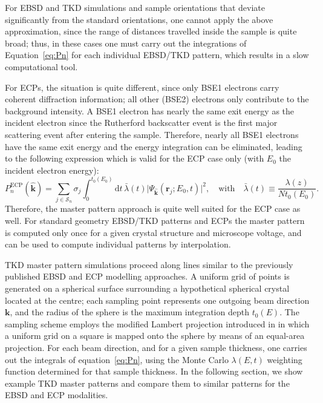 For EBSD and TKD simulations and sample orientations that deviate significantly from the standard orientations, one cannot apply the above approximation, since the range of distances travelled inside the sample is quite broad; thus, in these cases one must carry out the integrations of Equation~\ref{eq:Pn} for each individual EBSD/TKD pattern, which results in a slow computational tool.

For ECPs, the situation is quite different, since only BSE1 electrons carry coherent diffraction information; all other (BSE2) electrons only contribute to the background intensity.  A BSE1 electron has nearly the same exit energy as the incident electron since the Rutherford backscatter event is the first major scattering event after entering the sample.  Therefore, nearly all BSE1 electrons have the same exit energy and the energy integration can be eliminated, leading to the following expression which is valid for the ECP case only (with $E_0$ the incident electron energy):
\begin{equation}
    P_n^{\text{ECP}}(\hat{\mathbf{k}}) = \sum_{j\in \mathcal{S}_n}\sigma_j
    \int_0^{t_0(E_0)}\!\!\!\!\!\!\mathrm{d}t\, \bar{\lambda}(t)\vert\Psi_{\hat{\mathbf{k}}}(\mathbf{r}_j;E_0,t)\vert^2,\quad\text{with}\quad  \bar{\lambda}(t) \equiv \frac{\lambda(z)}{N t_0(E_0)}.\label{eq:PnECP}
\end{equation}
Therefore, the master pattern approach is quite well suited for the ECP case as well. For standard geometry EBSD/TKD patterns and ECPs the master pattern is computed only once for a given crystal structure and microscope voltage, and can be used to compute individual patterns by interpolation.  

TKD master pattern simulations proceed along lines similar to the previously published EBSD \cite{degraef2013e} and ECP \cite{degraef2017k} modelling approaches. A uniform grid of points is generated on a spherical surface surrounding a hypothetical spherical crystal located at the centre; each sampling point represents one outgoing beam direction $\mathbf{k}$, and the radius of the sphere is the maximum integration depth $t_0(E)$.  The sampling scheme employs the modified Lambert projection introduced in
\cite{rosca2010a, degraef2013e} in which a uniform grid on a square is mapped onto the sphere by means of an
equal-area projection. For each beam direction, and for a given sample thickness, one carries out the
integrals of equation~\ref{eq:Pn}, using the Monte Carlo $\lambda(E,t)$ weighting function determined for that sample thickness.  In the following section, we show example TKD master patterns and compare them to similar patterns for the EBSD and ECP modalities.





